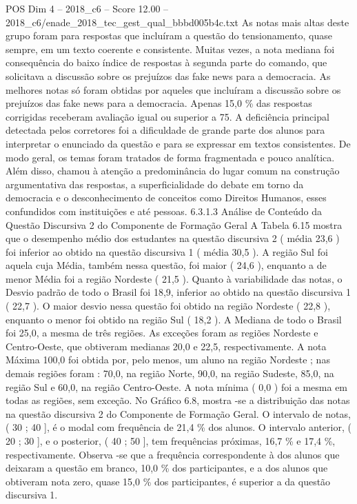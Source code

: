 \begin{textsample}{POS Dim 4 – 2018\_c6 – Score 12.00 – 2018\_c6/enade\_2018\_tec\_gest\_qual\_bbbd005b4c.txt}
As notas mais altas deste grupo foram para respostas que incluíram a questão do tensionamento, quase sempre, em um texto coerente e consistente.
Muitas vezes, a nota mediana foi consequência do baixo índice de respostas à segunda parte do comando, que solicitava a discussão sobre os prejuízos das fake news para a democracia.
As melhores notas só foram obtidas por aqueles que incluíram a discussão sobre os prejuízos das fake news para a democracia.
Apenas 15,0 \% das respostas corrigidas receberam avaliação igual ou superior a 75.
A deficiência principal detectada pelos corretores foi a dificuldade de grande parte dos alunos para interpretar o enunciado da questão e para se expressar em textos consistentes.
De modo geral, os temas foram tratados de forma fragmentada e pouco analítica.
Além disso, chamou à atenção a predominância do lugar comum na construção argumentativa das respostas, a superficialidade do debate em torno da democracia e o desconhecimento de conceitos como Direitos Humanos, esses confundidos com instituições e até pessoas. 6.3.1.3 Análise de Conteúdo da Questão Discursiva 2 do Componente de Formação Geral A Tabela 6.15 mostra que o desempenho médio dos estudantes na questão discursiva 2 ( média 23,6 ) foi inferior ao obtido na questão discursiva 1 ( média 30,5 ).
A região Sul foi aquela cuja Média, também nessa questão, foi maior ( 24,6 ), enquanto a de menor Média foi a região Nordeste ( 21,5 ).
Quanto à variabilidade das notas, o Desvio padrão de todo o Brasil foi 18,9, inferior ao obtido na questão discursiva 1 ( 22,7 ).
O maior desvio nessa questão foi obtido na região Nordeste ( 22,8 ), enquanto o menor foi obtido na região Sul ( 18,2 ).
A Mediana de todo o Brasil foi 25,0, a mesma de três regiões.
As exceções foram as regiões Nordeste e Centro-Oeste, que obtiveram medianas 20,0 e 22,5, respectivamente.
A nota Máxima 100,0 foi obtida por, pelo menos, um aluno na região Nordeste ; nas demais regiões foram : 70,0, na região Norte, 90,0, na região Sudeste, 85,0, na região Sul e 60,0, na região Centro-Oeste.
A nota mínima ( 0,0 ) foi a mesma em todas as regiões, sem exceção.
No Gráfico 6.8, mostra -se a distribuição das notas na questão discursiva 2 do Componente de Formação Geral.
O intervalo de notas, ( 30 ; 40 ], é o modal com frequência de 21,4 \% dos alunos.
O intervalo anterior, ( 20 ; 30 ], e o posterior, ( 40 ; 50 ], tem frequências próximas, 16,7 \% e 17,4 \%, respectivamente.
Observa -se que a frequência correspondente à dos alunos que deixaram a questão em branco, 10,0 \% dos participantes, e a dos alunos que obtiveram nota zero, quase 15,0 \% dos participantes, é superior a da questão discursiva 1.

\end{textsample}
